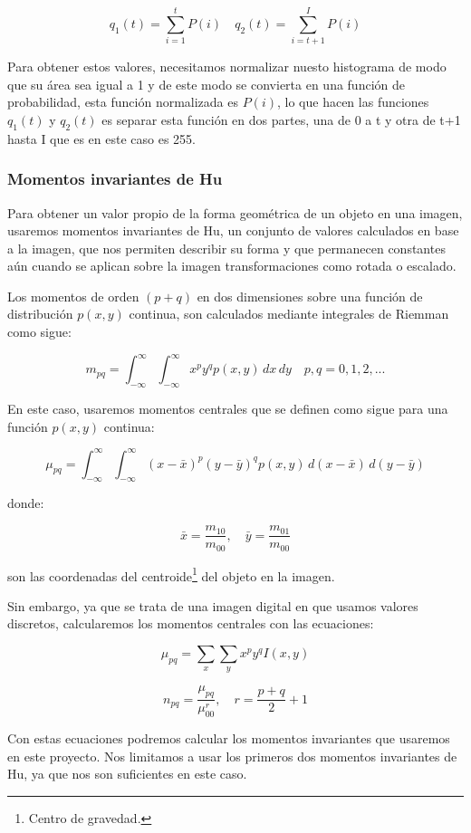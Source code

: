 \documentclass[letter]{article}
\begin{document}
$$ q_1(t) = \sum_{i=1}^t P(i) \quad q_2(t) = \sum_{i=t+1}^I P(i) $$

Para obtener estos valores, necesitamos normalizar nuesto histograma de modo que
su área sea igual a 1 y de este modo se convierta en una función de
probabilidad, esta función normalizada es \(P(i)\), lo que hacen las funciones
\(q_1(t)\) y \(q_2(t)\) es separar esta función en dos partes, una de 0 a t y otra
de t+1 hasta I que es en este caso es 255.

\subsubsection{Momentos invariantes de Hu}
\label{sec:org91fee14}
Para obtener un valor propio de la forma geométrica de un objeto en una imagen,
usaremos momentos invariantes de Hu, un conjunto de valores calculados en base a
la imagen, que nos permiten describir su forma y que permanecen constantes aún
cuando se aplican sobre la imagen transformaciones como rotada o escalado.

Los momentos de orden \((p+q)\) en dos dimensiones sobre una función de
distribución \(p(x, y)\) continua, son calculados mediante integrales de Riemman
como sigue:

$$ m_{pq} =  \int_{-\infty}^{\infty} \int_{-\infty}^{\infty} x^p y^q p(x, y)\,dx\,dy \quad p, q = 0, 1, 2, ... $$

En este caso, usaremos momentos centrales que se definen como sigue para una
función \(p(x, y)\) continua:

$$ \mu_{pq} = \int_{-\infty}^{\infty} \int_{-\infty}^{\infty} (x-\bar x)^p (y-\bar y)^q p(x, y)\, d(x-\bar x)\,d(y-\bar y) $$

donde:

$$ \bar x = \frac{m_{10}}{m_{00}}, \quad \bar y = \frac{m_{01}}{m_{00}} $$

son las coordenadas del centroide\footnote{Centro de gravedad.} del objeto en la imagen.

Sin embargo, ya que se trata de una imagen digital en que usamos valores
discretos, calcularemos los momentos centrales con las ecuaciones:

$$
\mu_{pq} = \sum_x \sum_y x^p y^q I(x, y)
$$

$$ n_{pq} = \frac{\mu_{pq}}{\mu_{00}^r}, \quad r=\frac{p+q}{2}+1 $$

Con estas ecuaciones podremos calcular los momentos invariantes que usaremos en
este proyecto. Nos limitamos a usar los primeros dos momentos invariantes de Hu,
ya que nos son suficientes en este caso.
\end{document}
